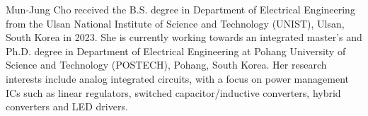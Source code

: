 \par{
Mun-Jung Cho received the B.S. degree in Department of Electrical Engineering from the Ulsan National Institute of Science and Technology (UNIST), Ulsan, South Korea in 2023. She is currently working towards an integrated master’s and Ph.D. degree in Department of Electrical Engineering at Pohang University of Science and Technology (POSTECH), Pohang, South Korea. Her research interests include analog integrated circuits, with a focus on power management ICs such as linear regulators, switched capacitor/inductive converters, hybrid converters and LED drivers.
}
